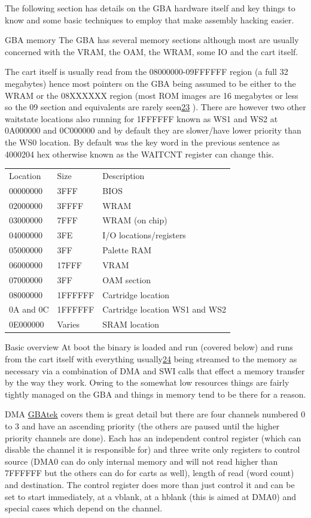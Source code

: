 \documentclass[
]{book}
\begin{document}
The following section has details on the GBA hardware itself and key things to know and some basic techniques to employ that make assembly hacking easier.

GBA memory The GBA has several memory sections although most are usually concerned with the VRAM, the OAM, the WRAM, some IO and the cart itself.

The cart itself is usually read from the 08000000-09FFFFFF region (a full 32 megabytes) hence most pointers on the GBA being assumed to be either to the WRAM or the 08XXXXXX region (most ROM images are 16 megabytes or less so the 09 section and equivalents are rarely seen\href{romhacking202024.html\#fn23x0}{23} ). There are however two other waitstate locations also running for 1FFFFFF known as WS1 and WS2 at 0A000000 and 0C000000 and by default they are slower/have lower priority than the WS0 location. By default was the key word in the previous sentence as 4000204 hex otherwise known as the WAITCNT register can change this.

\begin{longtable}[]{@{}lll@{}}
\toprule()
\endhead
Location & Size & Description \\
00000000 & 3FFF & BIOS \\
02000000 & 3FFFF & WRAM \\
03000000 & 7FFF & WRAM (on chip) \\
04000000 & 3FE & I/O locations/registers \\
05000000 & 3FF & Palette RAM \\
06000000 & 17FFF & VRAM \\
07000000 & 3FF & OAM section \\
08000000 & 1FFFFFF & Cartridge location \\
0A and 0C & 1FFFFFF & Cartridge location WS1 and WS2 \\
0E000000 & Varies & SRAM location \\
\bottomrule()
\end{longtable}

Basic overview At boot the binary is loaded and run (covered below) and runs from the cart itself with everything usually\href{romhacking202025.html\#fn24x0}{24} being streamed to the memory as necessary via a combination of DMA and SWI calls that effect a memory transfer by the way they work. Owing to the somewhat low resources things are fairly tightly managed on the GBA and things in memory tend to be there for a reason.

DMA \href{http://problemkaputt.de/gbatek.htm\#gbadmatransfers}{GBAtek} covers them is great detail but there are four channels numbered 0 to 3 and have an ascending priority (the others are paused until the higher priority channels are done). Each has an independent control register (which can disable the channel it is responsible for) and three write only registers to control source (DMA0 can do only internal memory and will not read higher than 7FFFFFF but the others can do for carts as well), length of read (word count) and destination. The control register does more than just control it and can be set to start immediately, at a vblank, at a hblank (this is aimed at DMA0) and special cases which depend on the channel.
\end{document}
